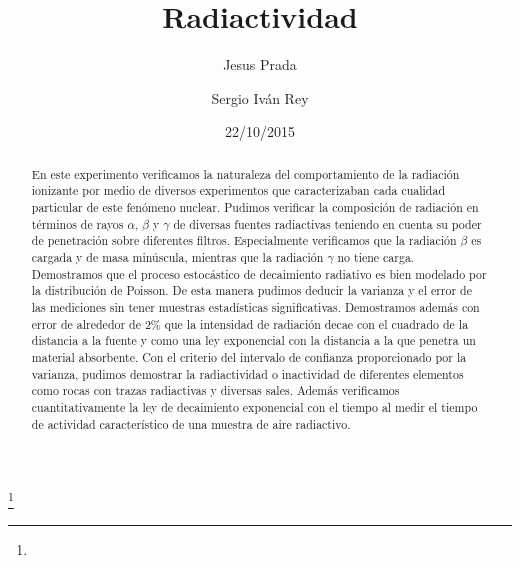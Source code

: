 \documentclass[%
 reprint,
 amsmath,amssymb,
 aps,
]{revtex4-1}
\begin{document}

\title{Radiactividad}%
\thanks{}%

\author{Jesus Prada}
\author{Sergio Iv\'an Rey}%
%

\date{22/10/2015}%

\begin{abstract}
En este experimento verificamos la naturaleza del comportamiento de la radiación ionizante por medio de diversos experimentos que caracterizaban cada cualidad particular de este fenómeno nuclear. Pudimos verificar la composición de radiación en términos de rayos $\alpha$, $\beta$ y $\gamma$ de diversas fuentes radiactivas teniendo en cuenta su poder de penetración sobre diferentes filtros. Especialmente verificamos que la radiación $\beta$ es cargada y de masa minúscula, mientras que la radiación $\gamma$ no tiene carga. Demostramos que el proceso estocástico de decaimiento radiativo es bien modelado por la distribución de Poisson. De esta manera pudimos deducir la varianza y el error de las mediciones sin tener muestras estadísticas significativas. Demostramos además con error de alrededor de 2\% que la intensidad de radiación decae con el cuadrado de la distancia a la fuente y como una ley exponencial con la distancia a la que penetra un material absorbente. Con el criterio del intervalo de confianza proporcionado por la varianza, pudimos demostrar la radiactividad o inactividad de diferentes elementos como rocas con trazas radiactivas y diversas sales. Además verificamos cuantitativamente la ley de decaimiento exponencial con el tiempo al medir el tiempo de actividad característico de una muestra de aire radiactivo.
\end{abstract}


\keywords{}%
\maketitle

\end{document}
